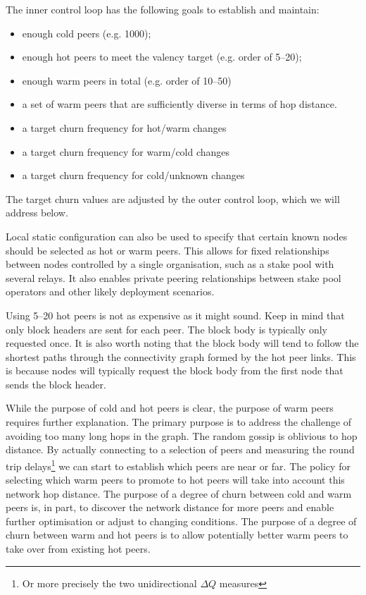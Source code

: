 \documentclass[11pt,a4paper]{article}
\begin{document}
The inner control loop has the following goals to establish and
maintain:

\begin{itemize}
\item
  enough cold peers (e.g. 1000);
\item
  enough hot peers to meet the valency target (e.g. order of 5--20);
\item
  enough warm peers in total (e.g. order of 10--50)
\item
  a set of warm peers that are sufficiently diverse in terms of hop
  distance.
\item
  a target churn frequency for hot/warm changes
\item
  a target churn frequency for warm/cold changes
\item
  a target churn frequency for cold/unknown changes
\end{itemize}

The target churn values are adjusted by the outer control loop, which we
will address below.

Local static configuration can also be used to specify that certain
known nodes should be selected as hot or warm peers. This allows for
fixed relationships between nodes controlled by a single organisation,
such as a stake pool with several relays. It also enables private
peering relationships between stake pool operators and other likely
deployment scenarios.

Using 5--20 hot peers is not as expensive as it might sound. Keep in
mind that only block headers are sent for each peer. The block body is
typically only requested once. It is also worth noting that the block
body will tend to follow the shortest paths through the connectivity
graph formed by the hot peer links. This is because nodes will typically
request the block body from the first node that sends the block header.

While the purpose of cold and hot peers is clear, the purpose of warm
peers requires further explanation. The primary purpose is to address
the challenge of avoiding too many long hops in the graph. The random
gossip is oblivious to hop distance. By actually connecting to a
selection of peers and measuring the round trip delays\footnote{Or more
  precisely the two unidirectional $\Delta{}Q$ measures} we can start to
establish which peers are near or far. The policy for selecting which
warm peers to promote to hot peers will take into account this network
hop distance. The purpose of a degree of churn between cold and warm
peers is, in part, to discover the network distance for more peers and
enable further optimisation or adjust to changing conditions. The
purpose of a degree of churn between warm and hot peers is to allow
potentially better warm peers to take over from existing hot peers.
\end{document}
